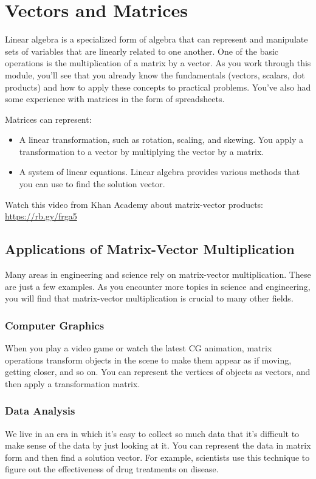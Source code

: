 \chapter{Vectors and Matrices}

Linear algebra is a specialized form of algebra that can represent and manipulate sets of variables that are linearly related to one another. One of the basic operations is the multiplication of a matrix by a vector. As you work through this module, you’ll see that you already know the fundamentals (vectors, scalars, dot products) and how to apply these concepts to practical problems. You’ve also had some experience with matrices in the form of spreadsheets. 

Matrices can represent:
\begin{itemize}
\item A linear transformation, such as rotation, scaling, and skewing. You apply a transformation to a vector by multiplying the vector by a matrix.  
\item A system of linear equations. Linear algebra provides various methods that you can use to find the solution vector. 
\end{itemize}

Watch this video from Khan Academy about matrix-vector products: \url{https://rb.gy/frga5}

\section{Applications of Matrix-Vector Multiplication}
Many areas in engineering and science rely on matrix-vector multiplication. These are just a few examples. As you encounter more topics in science and engineering, you will find that matrix-vector multiplication is crucial to many other fields.

\subsection{Computer Graphics}
When you play a video game or watch the latest CG animation, matrix operations transform objects in the scene to make them appear as if moving, getting closer, and so on. You can represent the vertices of objects as vectors, and then apply a transformation matrix.

\subsection{Data Analysis}
We live in an era in which it's easy to collect so much data that it's difficult to make sense of the data by just looking at it. You can represent the data in matrix form and then find a solution vector. For example, scientists use this technique to figure out the effectiveness of drug treatments on disease.

